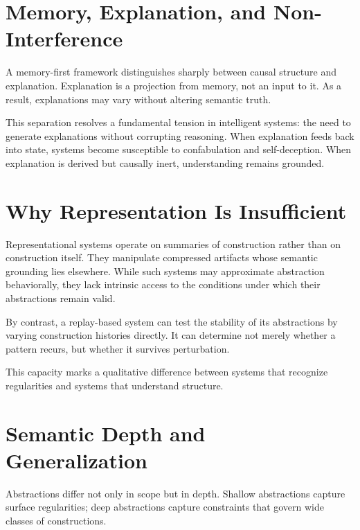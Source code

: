 \documentclass[11pt]{article}
\begin{document}
\section{Memory, Explanation, and Non-Interference}

A memory-first framework distinguishes sharply between causal structure and explanation. Explanation is a projection from memory, not an input to it. As a result, explanations may vary without altering semantic truth.

This separation resolves a fundamental tension in intelligent systems: the need to generate explanations without corrupting reasoning. When explanation feeds back into state, systems become susceptible to confabulation and self-deception. When explanation is derived but causally inert, understanding remains grounded.

\section{Why Representation Is Insufficient}

Representational systems operate on summaries of construction rather than on construction itself. They manipulate compressed artifacts whose semantic grounding lies elsewhere. While such systems may approximate abstraction behaviorally, they lack intrinsic access to the conditions under which their abstractions remain valid.

By contrast, a replay-based system can test the stability of its abstractions by varying construction histories directly. It can determine not merely whether a pattern recurs, but whether it survives perturbation.

This capacity marks a qualitative difference between systems that recognize regularities and systems that understand structure.

\section{Semantic Depth and Generalization}

Abstractions differ not only in scope but in depth. Shallow abstractions capture surface regularities; deep abstractions capture constraints that govern wide classes of constructions.
\end{document}
